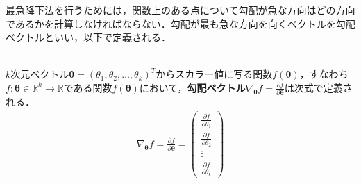 最急降下法を行うためには，関数上のある点について勾配が急な方向はどの方向であるかを計算しなければならない．勾配が最も急な方向を向くベクトルを勾配ベクトルといい，以下で定義される．
\begin{defi}[勾配ベクトル]
　\\
$k$次元ベクトル${\bm \theta}=(\theta_1,\theta_2,\ldots,\theta_k)^T$からスカラー値に写る関数$f({\bm \theta})$，すなわち$f:{\bm \theta} \in \mathbb{R}^k \to \mathbb{R}$である関数$f({\bm \theta})$において，{\bf 勾配ベクトル}$\nabla_{{\bm \theta}}f=\frac{\partial f}{\partial {\bm \theta}}$は次式で定義される．
\begin{align}
\nabla_{{\bm \theta}}f = \frac{\partial f}{\partial {\bm \theta}} = 
\left( 
\begin{array}{c}
\frac{\partial f}{\partial \theta_1} \\
\frac{\partial f}{\partial \theta_2} \\
\vdots \\
\frac{\partial f}{\partial \theta_k}
\end{array}
\right)
\end{align}
\end{defi}

